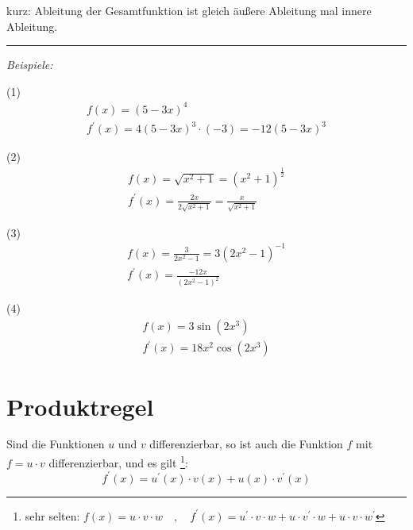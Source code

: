 kurz: \glqq Ableitung der Gesamtfunktion ist gleich äußere Ableitung mal innere Ableitung.\grqq{}

\noindent\rule{\textwidth}{1pt}

\textit{Beispiele:}

(1)
\begin{equation*}
    \begin{gathered}
        f(x)  = (5-3x)^4 \\
        f^{\prime}(x)  = 4(5-3x)^3 \cdot (-3) = -12(5-3x)^3
    \end{gathered}
\end{equation*}

(2)
\begin{equation*}
    \begin{gathered}
        f(x)  = \sqrt{x^2 + 1} = (x^2 + 1)^\frac{1}{2} \\
        f^{\prime}(x)  = \frac{2x}{2\sqrt{x^2 + 1}} = \frac{x}{\sqrt{x^2 + 1}}
    \end{gathered}
\end{equation*}

(3)
\begin{equation*}
    \begin{gathered}
        f(x)  = \frac{3}{2x^2 - 1} = 3(2x^2 - 1)^{-1} \\
        f^{\prime}(x)  = \frac{-12x}{(2x^2 - 1)^2}
    \end{gathered}
\end{equation*}

(4)
\begin{equation*}
    \begin{gathered}
        f(x)  = 3\sin(2x^3) \\
        f^{\prime}(x)  = 18x^2\cos(2x^3)
    \end{gathered}
\end{equation*}

\section{Produktregel}

\begin{satz}
Sind die Funktionen $u$ und $v$ differenzierbar, so ist auch die Funktion $f$ mit $f = u \cdot v$ differenzierbar, und es gilt \footnote{sehr selten: $f(x) = u\cdot v\cdot w \quad , \quad f^\prime(x) = u^\prime \cdot v \cdot w + u \cdot v^\prime \cdot w + u \cdot v \cdot w^\prime$}:
$$f^\prime(x) = u^\prime(x) \cdot v(x) + u(x) \cdot v^\prime(x)$$
\end{satz}

